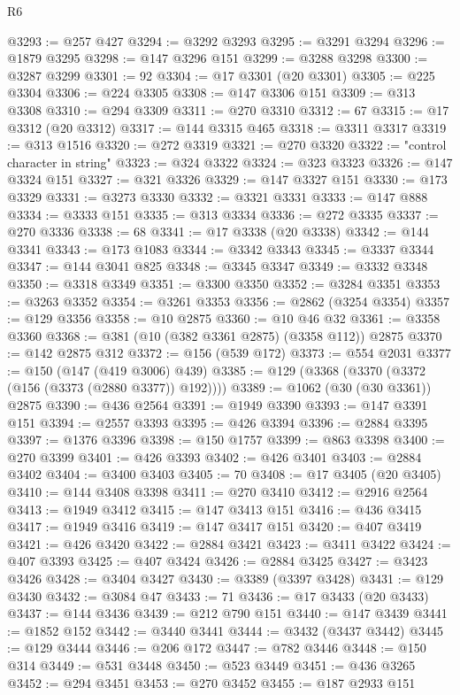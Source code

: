 \begin{lexlean}{R6}
\begin{coremodule}
@3293 := @257 @427
@3294 := @3292 @3293
@3295 := @3291 @3294
@3296 := @1879 @3295
@3298 := @147 @3296 @151
@3299 := @3288 @3298
@3300 := @3287 @3299
@3301 := 92
@3304 := @17 @3301 (@20 @3301)
@3305 := @225 @3304
@3306 := @224 @3305
@3308 := @147 @3306 @151
@3309 := @313 @3308
@3310 := @294 @3309
@3311 := @270 @3310
@3312 := 67
@3315 := @17 @3312 (@20 @3312)
@3317 := @144 @3315 @465
@3318 := @3311 @3317
@3319 := @313 @1516
@3320 := @272 @3319
@3321 := @270 @3320
@3322 := "control character in string"
@3323 := @324 @3322
@3324 := @323 @3323
@3326 := @147 @3324 @151
@3327 := @321 @3326
@3329 := @147 @3327 @151
@3330 := @173 @3329
@3331 := @3273 @3330
@3332 := @3321 @3331
@3333 := @147 @888
@3334 := @3333 @151
@3335 := @313 @3334
@3336 := @272 @3335
@3337 := @270 @3336
@3338 := 68
@3341 := @17 @3338 (@20 @3338)
@3342 := @144 @3341
@3343 := @173 @1083
@3344 := @3342 @3343
@3345 := @3337 @3344
@3347 := @144 @3041 @825
@3348 := @3345 @3347
@3349 := @3332 @3348
@3350 := @3318 @3349
@3351 := @3300 @3350
@3352 := @3284 @3351
@3353 := @3263 @3352
@3354 := @3261 @3353
@3356 := @2862 (@3254 @3354)
@3357 := @129 @3356
@3358 := @10 @2875
@3360 := @10 @46 @32
@3361 := @3358 @3360
@3368 := @381 (@10 (@382 @3361 @2875) (@3358 @112)) @2875
@3370 := @142 @2875 @312
@3372 := @156 (@539 @172)
@3373 := @554 @2031
@3377 := @150 (@147 (@419 @3006) @439)
@3385 := @129 (@3368 (@3370 (@3372 (@156 (@3373 (@2880 @3377)) @192))))
@3389 := @1062 (@30 (@30 @3361)) @2875
@3390 := @436 @2564
@3391 := @1949 @3390
@3393 := @147 @3391 @151
@3394 := @2557 @3393
@3395 := @426 @3394
@3396 := @2884 @3395
@3397 := @1376 @3396
@3398 := @150 @1757
@3399 := @863 @3398
@3400 := @270 @3399
@3401 := @426 @3393
@3402 := @426 @3401
@3403 := @2884 @3402
@3404 := @3400 @3403
@3405 := 70
@3408 := @17 @3405 (@20 @3405)
@3410 := @144 @3408 @3398
@3411 := @270 @3410
@3412 := @2916 @2564
@3413 := @1949 @3412
@3415 := @147 @3413 @151
@3416 := @436 @3415
@3417 := @1949 @3416
@3419 := @147 @3417 @151
@3420 := @407 @3419
@3421 := @426 @3420
@3422 := @2884 @3421
@3423 := @3411 @3422
@3424 := @407 @3393
@3425 := @407 @3424
@3426 := @2884 @3425
@3427 := @3423 @3426
@3428 := @3404 @3427
@3430 := @3389 (@3397 @3428)
@3431 := @129 @3430
@3432 := @3084 @47
@3433 := 71
@3436 := @17 @3433 (@20 @3433)
@3437 := @144 @3436
@3439 := @212 @790 @151
@3440 := @147 @3439
@3441 := @1852 @152
@3442 := @3440 @3441
@3444 := @3432 (@3437 @3442)
@3445 := @129 @3444
@3446 := @206 @172
@3447 := @782 @3446
@3448 := @150 @314
@3449 := @531 @3448
@3450 := @523 @3449
@3451 := @436 @3265
@3452 := @294 @3451
@3453 := @270 @3452
@3455 := @187 @2933 @151

\end{coremodule}
\end{lexlean}
